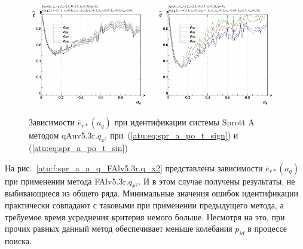 \begin{figure}[h!]
  \centerline{
    \includegraphics[width=0.49\textwidth]{p/cha/spr_a/qAuv5.3r/sprott_a_qAuv5_3r_qx2-p_a_q_e_sign.png}
    \hfill
    \includegraphics[width=0.49\textwidth]{p/cha/spr_a/qAuv5.3r/sprott_a_qAuv5_3r_qx2-p_a_q_e_sin.png}
  }
  \caption{Зависимости $\overline{e}_{r*}(a_q)$ при идентификации системы Sprott A методом qAuv5.3r.$q_{x^2}$
   при~(\ref{atu:eq:spr_a_po_t_sign}) и (\ref{atu:eq:spr_a_po_t_sin})}
  \label{atu:f:spr_a_a_q_qAuv5.3r.q_x2}
\end{figure}


На рис.~\ref{atu:f:spr_a_a_q_FAlv5.3r.q_x2} представлены зависимости
$\overline{e}_{r*}(a_q)$ при применении метода FAlv5.3r.$q_{x^2}$.
И в этом случае получены результаты, не выбивающиеся из общего ряда.
Минимальные значения ошибок идентификации практически совпадают
с таковыми при применении предыдущего метода, а требуемое
время усреднения критерия немого больше. Несмотря на это,
при прочих равных данный метод обеспечивает меньше колебания $p_{id}$
в процессе поиска.


